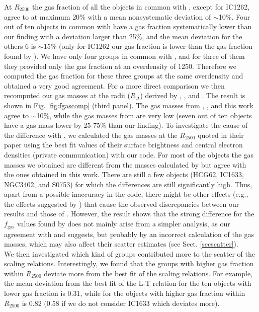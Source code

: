 \documentclass{aa} %
\begin{document}
At $R_{2500}$ the gas fraction of all the objects in common with \citet{2009ApJ...693.1142S}, except for IC1262,  agree to at maximum $20\%$
with a mean nonsystematic deviation of $\sim$10$\%$. Four out of ten objects in common with \citet{2011A&A...535A.105E} have a gas fraction systematically lower than our finding with a deviation larger than 25$\%$, and the mean deviation for the others 6 is
$\sim$15$\%$ (only for IC1262 our gas fraction is lower than the gas fraction found by \citealt{2011A&A...535A.105E}). We have only four groups in common with \citet{2007ApJ...669..158G}, and for three of them they provided only
the gas fraction at an overdensity of 1250. Therefore we computed the gas fraction for these three groups at the same overdensity and obtained a very good agreement. For a more direct comparison we then recomputed our gas masses at the radii ($R_{\Delta}$) derived by \citet{2007ApJ...669..158G}, \citet{2009ApJ...693.1142S}, and  \citet{2011A&A...535A.105E}.  The result is shown in Fig. \ref{fig:fgascomp} (third panel). The gas masses from \citet{2009ApJ...693.1142S}, \citet{2007ApJ...669..158G}, and this work agree to $\sim$10$\%$, while the gas masses from \citet{2011A&A...535A.105E} are very low (seven out of ten objects have a gas mass lower by 25-75$\%$ than our finding). To investigate the cause of the difference with \citet{2011A&A...535A.105E}, we calculated the gas masses at the $R_{2500}$ quoted in their paper using the best fit values of their surface brightness and central electron densities  (private communication) with our code. For most of the objects the gas masses we obtained are different from the masses calculated by \citet{2011A&A...535A.105E} 
but agree with the ones obtained in this work. There are still a few objects (HCG62, IC1633, NGC3402, and S0753) for which the differences are still significantly high. Thus, apart from a possible inaccuracy in the code, there might be other effects (e.g., the effects suggested by \citealt{2012NJPh...14d5004S}) that cause the observed discrepancies between our results and those of \citet{2011A&A...535A.105E}. However, the result shows that the strong
difference for the $f_{\text{gas}}$ values found by
\citet{2011A&A...535A.105E} does not mainly arise from a simpler analysis, as our agreement with \citet{2009ApJ...693.1142S} and \citet{2007ApJ...669..158G} suggests, but probably  by an incorrect calculation of the gas masses, which may also affect their scatter estimates (see Sect. \ref{secscatter}).\\
We then investigated which kind of groups contributed more to the scatter of the scaling relations. Interestingly, we found that the groups with higher gas fraction within $R_{2500}$ deviate more from the best fit of the scaling relations. For example, the mean deviation from the best fit of the L-T relation for the ten objects with lower gas fraction is 0.31, while for the objects with higher gas fraction within $R_{2500}$ is 0.82 (0.58 if we do not consider IC1633 which deviates more). 
\end{document}
